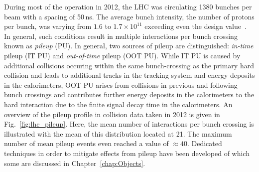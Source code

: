 During most of the operation in 2012, the LHC was circulating 1380 bunches per beam with a spacing of 50\,ns. The average bunch intensity, \ie the number of protons per bunch, was varying from $1.6$ to $1.7 \times 10^{11}$ exceeding even the design value~\cite{bib:lhc:lumi12, Lamont:2013cma}. In general, such conditions result in multiple interactions per bunch crossing known as \textit{pileup} (PU). In general, two sources of pileup are distinguished: \textit{in-time} pileup (IT PU) and \textit{out-of-time} pileup (OOT PU). While IT PU is caused by additional \pp collisions occuring within the same bunch-crossing as the primary hard collision and leads to additional tracks in the tracking system and energy deposits in the calorimeters, OOT PU arises from \pp collisions in previous and following bunch crossings and contributes further energy deposits in the calorimeters to the hard interaction due to the finite signal decay time in the calorimeters. An overview of the pileup profile in collision data taken in 2012 is given in Fig.~\ref{fig:lhc_pileup}. Here, the mean number of interactions per bunch crossing is illustrated with the mean of this distribution located at 21. The maximum number of mean pileup events even reached a value of $\approx 40$. Dedicated techniques in order to mitigate effects from pileup have been developed of which some are discussed in Chapter~\ref{chap:Objects}.





